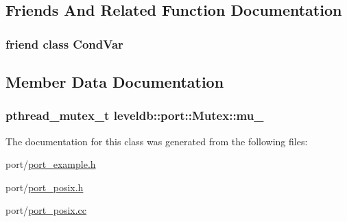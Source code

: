 \subsection{Friends And Related Function Documentation}
\hypertarget{classleveldb_1_1port_1_1_mutex_a7f15caac4fd04184afa33f61e738fb41}{
\subsubsection[{Cond\-Var}]{\setlength{\rightskip}{0pt plus 5cm}friend class {\bf Cond\-Var}\hspace{0.3cm}{\ttfamily [friend]}}}\label{classleveldb_1_1port_1_1_mutex_a7f15caac4fd04184afa33f61e738fb41}


\subsection{Member Data Documentation}
\hypertarget{classleveldb_1_1port_1_1_mutex_aa3574934fb8d1cdad3467f72fceaa5b8}{
\subsubsection[{mu\-\_\-}]{\setlength{\rightskip}{0pt plus 5cm}pthread\-\_\-mutex\-\_\-t leveldb\-::port\-::\-Mutex\-::mu\-\_\-\hspace{0.3cm}{\ttfamily [private]}}}\label{classleveldb_1_1port_1_1_mutex_aa3574934fb8d1cdad3467f72fceaa5b8}


The documentation for this class was generated from the following files\-:\begin{DoxyCompactItemize}
\item 
port/\hyperlink{port__example_8h}{port\-\_\-example.\-h}\item 
port/\hyperlink{port__posix_8h}{port\-\_\-posix.\-h}\item 
port/\hyperlink{port__posix_8cc}{port\-\_\-posix.\-cc}\end{DoxyCompactItemize}
